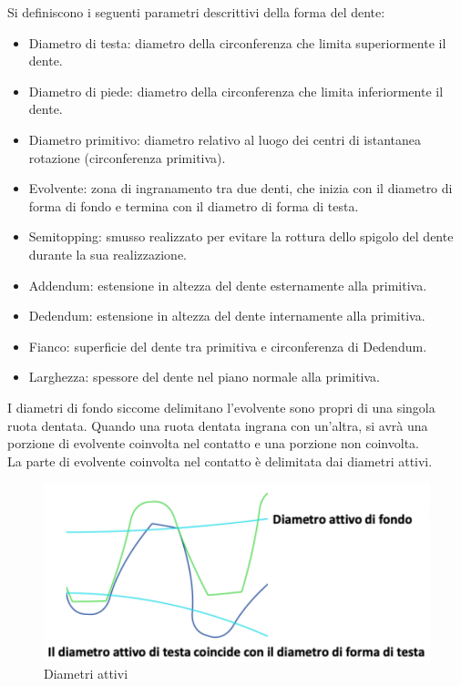 Si definiscono i seguenti parametri descrittivi della forma del dente:
\begin{itemize}
    \item Diametro di testa: diametro della circonferenza che limita superiormente il dente. 
    \item Diametro di piede: diametro della circonferenza che limita inferiormente il dente. 
    \item Diametro primitivo: diametro relativo al luogo dei centri di istantanea rotazione (circonferenza primitiva).
    \item Evolvente: zona di ingranamento tra due denti, che inizia con il diametro di forma di fondo e termina con il diametro di forma di testa. 
    \item Semitopping: smusso realizzato per evitare la rottura dello spigolo del dente durante la sua realizzazione. 
    \item Addendum: estensione in altezza del dente esternamente alla primitiva. 
    \item Dedendum: estensione in altezza del dente internamente alla primitiva.
    \item Fianco: superficie del dente tra primitiva e circonferenza di Dedendum.
    \item Larghezza: spessore del dente nel piano normale alla primitiva. 
\end{itemize}
\newpage
I diametri di fondo siccome delimitano l’evolvente sono propri di una singola ruota dentata. Quando una ruota dentata ingrana con un’altra, si avrà una porzione di evolvente coinvolta nel
contatto e una porzione non coinvolta.\\
La parte di evolvente coinvolta nel contatto è delimitata dai diametri attivi.
\begin{figure}[h]
    \centering
    \includegraphics[scale=0.5]{Immagini/DiametriAttivi.png}
    \caption{Diametri attivi}
    \label{fig:DiametriAttivi}
\end{figure}

